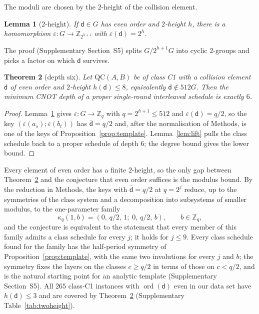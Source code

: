 \documentclass[reprint,twocolumn,superscriptaddress,nofootinbib]{revtex4-2}
\theoremstyle{plain}
\newtheorem{theorem}{Theorem}
\newtheorem{lemma}[theorem]{Lemma}
\newcommand{\Zq}{\mathbb{Z}_q}
\newcommand{\col}{\mathsf{d}}          %
\newcommand{\colbar}{\bar{\mathsf{d}}} %
\begin{document}
The moduli are chosen by the $2$-height of the collision element.

\begin{lemma}[$2$-height]
\label{lem:height}
If $\col\in G$ has even order and $2$-height $h$, there is a homomorphism
$\varepsilon:G\to\mathbb{Z}_{2^{h+1}}$ with $\varepsilon(\col)=2^h$.
\end{lemma}

The proof (Supplementary Section~S5) splits $G/2^{h+1}G$ into cyclic
$2$-groups and picks a factor on which $\col$ survives.

\begin{theorem}[depth six]
\label{thm:six}
Let $\mathrm{QC}(A,B)$ be of class C1 with a collision element $\col$ of
even order and $2$-height $h(\col)\le8$, equivalently $\col\notin512G$.
Then the minimum CNOT depth of a proper single-round interleaved schedule
is exactly $6$.
\end{theorem}

\begin{proof}
Lemma~\ref{lem:height} gives $\varepsilon:G\to\Zq$ with $q=2^{h+1}\le512$
and $\varepsilon(\col)=q/2$, so the key $(\varepsilon(a_s);\varepsilon(b_t))$
has $\colbar=q/2$ and, after the normalisation of Methods, is one of the
keys of Proposition~\ref{prop:template}. Lemma~\ref{lem:lift} pulls the
class schedule back to a proper schedule of depth $6$; the degree bound
gives the lower bound.
\end{proof}

Every element of even order has a finite $2$-height, so the only gap
between Theorem~\ref{thm:six} and the conjecture that even order suffices
is the modulus bound. By the reduction in Methods, the keys with
$\colbar=q/2$ at $q=2^j$ reduce, up to the symmetries of the class system
and a decomposition into subsystems of smaller modulus, to the
one-parameter family
\begin{equation}
\kappa_q(1,b)=(0,\,q/2,\,1;\;0,\,q/2,\,b),\qquad b\in\Zq ,
\label{eq:family}
\end{equation}
and the conjecture is equivalent to the statement that every member of
this family admits a class schedule for every $j$; it holds for $j\le9$.
Every class schedule found for the family has the half-period symmetry of
Proposition~\ref{prop:template}, with the same two involutions for every
$j$ and $b$; the symmetry fixes the layers on the classes $c\ge q/2$ in
terms of those on $c<q/2$, and is the natural starting point for an
analytic template (Supplementary Section~S5). All $265$ class-C1 instances with $\operatorname{ord}(\col)$ even in our
data set have $h(\col)\le3$ and are covered by Theorem~\ref{thm:six}
(Supplementary Table~\ref{tab:twoheight}).
\end{document}
